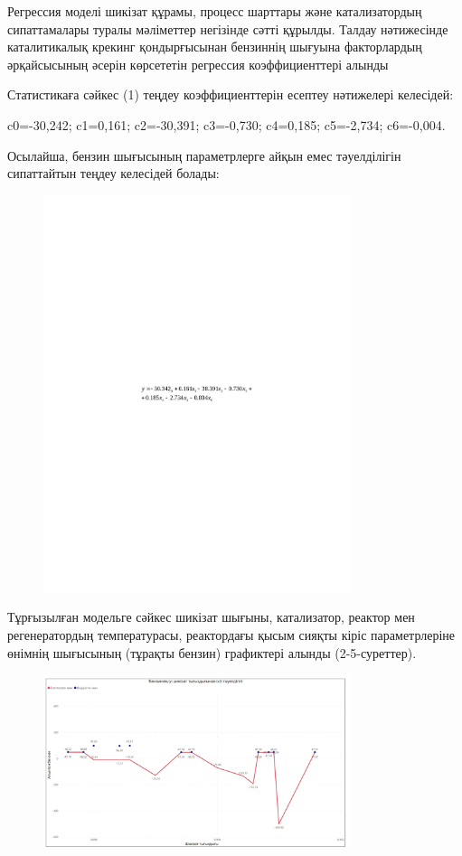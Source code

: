 Регрессия моделі шикізат құрамы, процесс шарттары және катализатордың
сипаттамалары туралы мәліметтер негізінде сәтті құрылды. Талдау
нәтижесінде каталитикалық крекинг қондырғысынан бензиннің шығуына
факторлардың әрқайсысының әсерін көрсететін регрессия коэффициенттері
алынды

Статистикаға сәйкес (1) теңдеу коэффициенттерін есептеу нәтижелері
келесідей:

c0=-30,242; c1=0,161; c2=-30,391; c3=-0,730; c4=0,185; c5=-2,734;
c6=-0,004.

Осылайша, бензин шығысының параметрлерге айқын емес тәуелділігін
сипаттайтын теңдеу келесідей болады:

\begin{figure}[H]
	\centering
	\includegraphics[width=0.8\textwidth]{media/ict/image94}
	\caption*{}
\end{figure}


Тұрғызылған модельге сәйкес шикізат шығыны, катализатор, реактор мен
регенератордың температурасы, реактордағы қысым сияқты кіріс
параметрлеріне өнімнің шығысының (тұрақты бензин) графиктері алынды
(2-5-суреттер).

\begin{figure}[H]
	\centering
	\includegraphics[width=0.8\textwidth]{media/ict/image95}
	\caption*{}
\end{figure}


